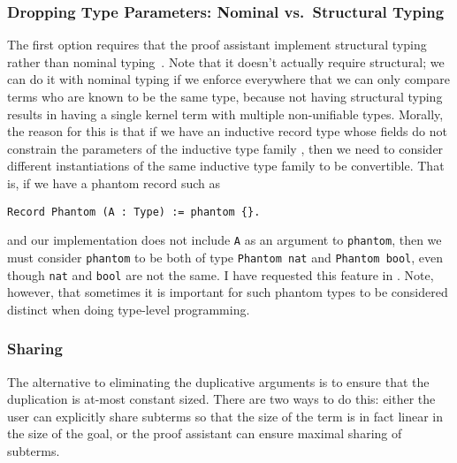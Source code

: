 \subsubsection{Dropping Type Parameters: Nominal vs.~Structural Typing} \label{sec:nominal-vs-structural} \label{sec:dropping-constructor-parameters}
The first option requires that the proof assistant implement structural typing rather than nominal typing~\cite[19.3 Nominal and Structural Type Systems]{tapl}.
 Note that it doesn't actually require structural; we can do it with nominal typing if we enforce everywhere that we can only compare terms who are known to be the same type, because not having structural typing results in having a single kernel term with multiple non-unifiable types.
Morally, the reason for this is that if we have an inductive record type   whose fields do not constrain the parameters of the inductive type family , then we need to consider different instantiations of the same inductive type family to be convertible.
That is, if we have a phantom record such as
\begin{verbatim}
Record Phantom (A : Type) := phantom {}.
\end{verbatim}
and our implementation does not include \texttt{A} as an argument to \texttt{phantom}, then we must consider \texttt{phantom} to be both of type \texttt{Phantom nat} and \texttt{Phantom bool}, even though \texttt{nat} and \texttt{bool} are not the same.
I have requested this feature in \cite{https://github.com/coq/coq/issues/5293}.
Note, however, that sometimes it is important for such phantom types to be considered distinct when doing type-level programming.

\subsubsection{Sharing} \label{sec:sharing}
The alternative to eliminating the duplicative arguments is to ensure that the duplication is at-most constant sized.
There are two ways to do this: either the user can explicitly share subterms so that the size of the term is in fact linear in the size of the goal, or the proof assistant can ensure maximal sharing of subterms.

